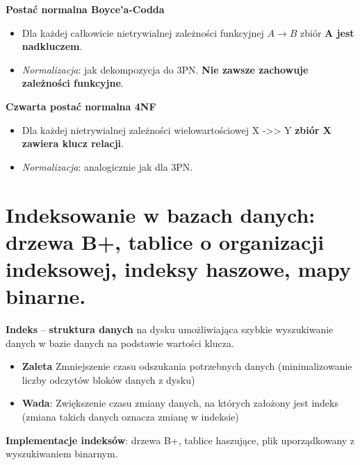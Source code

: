 \documentclass[main.tex]{subfiles}
\begin{document}
    \noindent \textbf{Postać normalna Boyce'a-Codda}
    \begin{itemize}[noitemsep]
        \item Dla każdej całkowicie nietrywialnej zależności funkcyjnej $A \rightarrow B$ zbiór \textbf{A jest nadkluczem}.
        \item \textit{Normalizacja}: jak dekompozycja do 3PN. \textbf{Nie zawsze zachowuje zależności funkcyjne}.
    \end{itemize}

    \noindent \textbf{Czwarta postać normalna 4NF}
    \begin{itemize}[noitemsep]
        \item Dla każdej nietrywialnej zależności wielowartościowej X ->> Y \textbf{zbiór X zawiera klucz relacji}.
        \item \textit{Normalizacja}: analogicznie jak dla 3PN.
    \end{itemize}


    \section{Indeksowanie w bazach danych: drzewa B+, tablice o organizacji indeksowej, indeksy haszowe, mapy binarne.}

    \textbf{Indeks} -- \textbf{struktura danych} na dysku umożliwiająca szybkie wyszukiwanie danych w bazie danych
    na podstawie wartości klucza.

    \begin{itemize}[noitemsep]
        \item \textbf{Zaleta} Zmniejszenie czasu odszukania potrzebnych danych (minimalizowanie liczby odczytów bloków danych z dysku)
        \item \textbf{Wada}: Zwiększenie czasu zmiany danych, na których założony jest indeks (zmiana takich danych oznacza zmianę w indeksie)
    \end{itemize}

    \noindent \textbf{Implementacje indeksów}: drzewa B+, tablice haszujące, plik uporządkowany z wyszukiwaniem binarnym.\\
\end{document}
